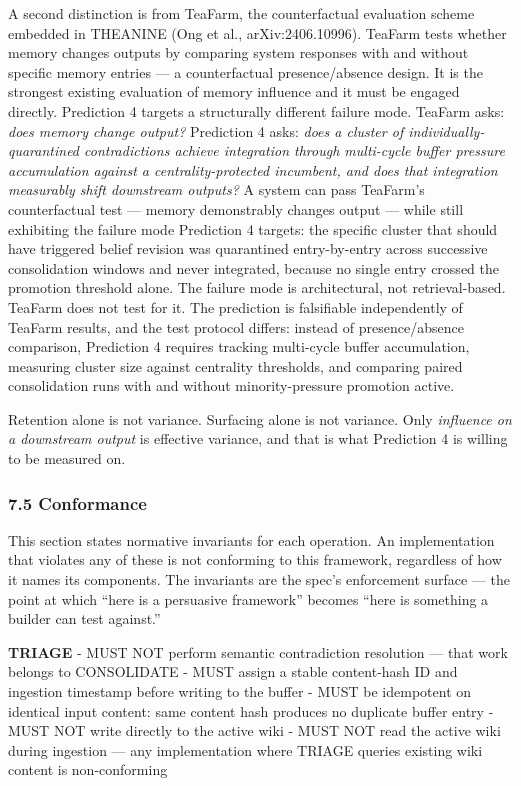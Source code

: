 \documentclass[
  11pt,
]{article}
\begin{document}
A second distinction is from TeaFarm, the counterfactual evaluation
scheme embedded in THEANINE (Ong et al., arXiv:2406.10996). TeaFarm
tests whether memory changes outputs by comparing system responses with
and without specific memory entries --- a counterfactual
presence/absence design. It is the strongest existing evaluation of
memory influence and it must be engaged directly. Prediction 4 targets a
structurally different failure mode. TeaFarm asks: \emph{does memory
change output?} Prediction 4 asks: \emph{does a cluster of
individually-quarantined contradictions achieve integration through
multi-cycle buffer pressure accumulation against a centrality-protected
incumbent, and does that integration measurably shift downstream
outputs?} A system can pass TeaFarm's counterfactual test --- memory
demonstrably changes output --- while still exhibiting the failure mode
Prediction 4 targets: the specific cluster that should have triggered
belief revision was quarantined entry-by-entry across successive
consolidation windows and never integrated, because no single entry
crossed the promotion threshold alone. The failure mode is
architectural, not retrieval-based. TeaFarm does not test for it. The
prediction is falsifiable independently of TeaFarm results, and the test
protocol differs: instead of presence/absence comparison, Prediction 4
requires tracking multi-cycle buffer accumulation, measuring cluster
size against centrality thresholds, and comparing paired consolidation
runs with and without minority-pressure promotion active.

Retention alone is not variance. Surfacing alone is not variance. Only
\emph{influence on a downstream output} is effective variance, and that
is what Prediction 4 is willing to be measured on.

\hypertarget{conformance}{%
\subsubsection{7.5 Conformance}\label{conformance}}

This section states normative invariants for each operation. An
implementation that violates any of these is not conforming to this
framework, regardless of how it names its components. The invariants are
the spec's enforcement surface --- the point at which ``here is a
persuasive framework'' becomes ``here is something a builder can test
against.''

\textbf{TRIAGE} - MUST NOT perform semantic contradiction resolution ---
that work belongs to CONSOLIDATE - MUST assign a stable content-hash ID
and ingestion timestamp before writing to the buffer - MUST be
idempotent on identical input content: same content hash produces no
duplicate buffer entry - MUST NOT write directly to the active wiki -
MUST NOT read the active wiki during ingestion --- any implementation
where TRIAGE queries existing wiki content is non-conforming
\end{document}
